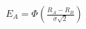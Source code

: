 \documentclass[preview]{standalone}
\begin{document}
\begin{align*}
E_A = \Phi\!\left(\frac{R_A - R_B}{\sigma\sqrt{2}}\right)
\end{align*}
\end{document}
